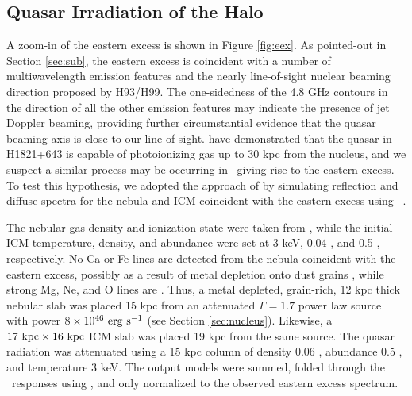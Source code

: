 \documentclass[useAMS,usenatbib]{mn2e}
\begin{document}
\subsection{Quasar Irradiation of the Halo}

A zoom-in of the eastern excess is shown in Figure \ref{fig:eex}. As
pointed-out in Section \ref{sec:sub}, the eastern excess is coincident
with a number of multiwavelength emission features and the nearly
line-of-sight nuclear beaming direction proposed by H93/H99. The
one-sidedness of the 4.8 GHz contours in the direction of all the
other emission features may indicate the presence of jet Doppler
beaming, providing further circumstantial evidence that the quasar
beaming axis is close to our
line-of-sight. \citet{2010MNRAS.402.1561R} have demonstrated that the
quasar in H1821+643 is capable of photoionizing gas up to 30 kpc from
the nucleus, and we suspect a similar process may be occurring in
\irs\ giving rise to the eastern excess. To test this hypothesis, we
adopted the approach of \citet{2010MNRAS.402.1561R} by simulating
reflection and diffuse spectra for the nebula and ICM coincident with
the eastern excess using \cloudy\ \citep{cloudy}.

The nebular gas density and ionization state were taken from
\citet{2000AJ....120..562T}, while the initial ICM temperature,
density, and abundance were set at 3 keV, 0.04 \pcc, and 0.5 \Zsol,
respectively. No Ca or Fe lines are detected from the nebula
coincident with the eastern excess, possibly as a result of metal
depletion onto dust grains \citep[\eg][]{1993ApJ...414L..17D}, while
strong Mg, Ne, and O lines are \citep{2000AJ....120..562T}. Thus, a
metal depleted, grain-rich, 12 kpc thick nebular slab was placed 15
kpc from an attenuated $\Gamma = 1.7$ power law source with power $8
\times 10^{46} ~\rm{\mbox{\ensuremath{\rm{erg}}}~\ensuremath{\rm{\mbox{\ensuremath{\rm{s}}}^{-1}}}}$ (see Section \ref{sec:nucleus}). Likewise, a $17
~\mbox{\ensuremath{\rm{kpc}}} \times 16 ~\mbox{\ensuremath{\rm{kpc}}}$ ICM slab was placed 19 kpc from the same
source. The quasar radiation was attenuated using a 15 kpc column of
density 0.06 \pcc, abundance 0.5 \Zsol, and temperature 3 keV. The
output models were summed, folded through the \cxo\ responses using
\xspec, and only normalized to the observed eastern excess spectrum.
\end{document}
